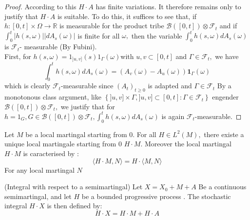 	\begin{proof}
		According to this $H \cdot A $ has finite variations. It therefore remains only to justify that $ H \cdot A $ is suitable. %
		To do this, it suffices to see that, if $ h: [0, t] \times \Omega \rightarrow \mathbb{R} $ is measurable for the product tribe $ \mathcal{B} ([0, t]) \otimes \mathcal{F} _ {t} $ and if $ \int_ {0}^{t} | h (s, \omega) | \left | dA_ {s} (\omega) \right | $ is finite for all $ \omega, $ then the variable $ \int_ {0}^{t} h (s, \omega) d A_ {s} (\omega) $ is $ \mathcal{F}_{t}$-
		measurable (By Fubini).\\
		First, for $ h (s, \omega) = 1_ {]u, v]} (s) 1_ {\Gamma} (\omega) $with $u, v\subset [0, t] $ and $ \Gamma \in \mathcal{F}_{t}, $ we have
		$$
		\int_{0}^{t} h(s, \omega)dA_ {s} (\omega) = \left (A_ {v}(\omega)-A_{u}(\omega) \right) \mathbf{1}_{\Gamma} (\omega)
		$$
		which is clearly $ \mathcal{F}_{t}$-measurable since $\left(A_{t}\right)_{t \geq 0} $ is adapted and $ \Gamma \in \mathcal{F}_{t} $
		By a monotonous class argument, like $ \left\lbrace  ]u, v] \times \Gamma, ]u, v] \subset [0, t]: \Gamma \in \mathcal{F}_{t} \right\rbrace  $ engender $\mathcal{B}([0, t]) \otimes \mathcal{F}_{t}, $ we justify that for $h=1_ {G}, G \in \mathcal{B} ([0, t]) \otimes \mathcal{F}_{t}, \int_{0}^{t} h(s, \omega)dA_{s}(\omega)$ is
		again $\mathcal{F}_{t} $-measurable.
	\end{proof}
	\begin{theorem}
		Let $M$ be a local martingal starting from 0. For all $H \in L^{2}(M),$ there existe a unique local martingale starting from $0$ $H \cdot M .$ Moreover the local martingal $H \cdot M$ is caracterised by :
		$$
		\langle H \cdot M, N\rangle= H \cdot\langle M, N\rangle
		$$
		For any local martingal $N$
	\end{theorem}
	\begin{definition}
		(Integral with respect to a semimartingal) Let $X=X_{0}+M+A$ Be a continuous semimartingal, and let $H$ be a bounded progressive process . The stochastic integral $H \cdot X$ is then defined by:
		$$
		H \cdot X=H \cdot M+H \cdot A
		$$
	\end{definition}

